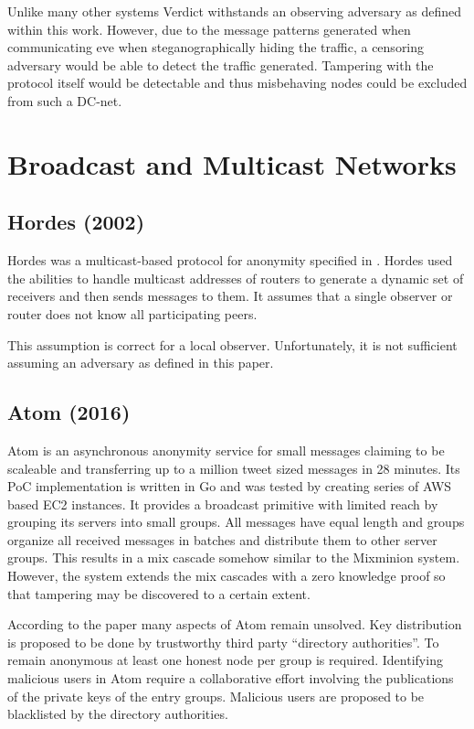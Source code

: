 Unlike many other systems Verdict withstands an observing adversary as defined within this work. However, due to the message patterns generated when communicating eve when steganographically hiding the traffic, a censoring adversary would be able to detect the traffic generated. Tampering with the protocol itself would be detectable and thus misbehaving nodes could be excluded from such a DC-net.

\section{Broadcast and Multicast Networks}
\subsection{Hordes (2002)}
Hordes was a multicast-based protocol for anonymity specified in \cite{Levine:2002}. Hordes used the abilities to handle multicast addresses of routers to generate a dynamic set of receivers and then sends messages to them. It assumes that a single observer or router does not know all participating peers. 


This assumption is correct for a local observer. Unfortunately, it is not sufficient assuming an adversary as defined in this paper.

\subsection{Atom (2016)}
Atom\cite{kwon2016atom} is an asynchronous anonymity service for small messages claiming to be scaleable and transferring up to a million tweet sized messages in 28 minutes. Its PoC implementation is written in Go and was tested by creating series of AWS based EC2 instances. It provides a broadcast primitive with limited reach by grouping its servers into small groups. All messages have equal length and groups organize all received messages in batches and distribute them to other server groups. This results in a mix cascade somehow similar to the Mixminion system. However, the system extends the mix cascades with a zero knowledge proof so that tampering may be discovered to a certain extent.

According to the paper many aspects of Atom remain unsolved. Key distribution is proposed to be done by trustworthy third party ``directory authorities''. To remain anonymous at least one honest node per group is required. Identifying malicious users in Atom require a collaborative effort involving the publications of the private keys of the entry groups. Malicious users are proposed to be blacklisted by the directory authorities. 

